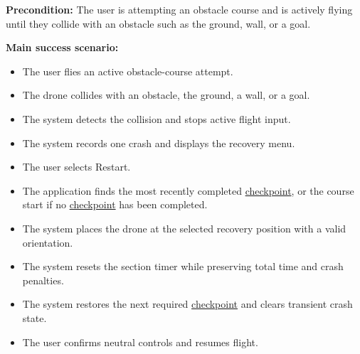 \documentclass[12pt]{article}
\begin{document}
\begin{description}
\textbf{Precondition:} The user is attempting an obstacle course and is
actively flying until they collide with an obstacle such as the ground, wall, or a goal.

\textbf{Main success scenario:}
\begin{itemize}
\item The user flies an active obstacle-course attempt.
\item The drone collides with an obstacle, the ground, a wall, or a goal.
\item The system detects the collision and stops active flight input.
\item The system records one crash and displays the recovery menu.
\item The user selects Restart.
\item The application finds the most recently completed \hyperlink{glos:Checkpoint}{checkpoint}, or the course start if
no \hyperlink{glos:Checkpoint}{checkpoint} has been completed.
\item The system places the drone at the selected recovery position with a valid
orientation.
\item The system resets the section timer while preserving total time and crash
penalties.
\item The system restores the next required \hyperlink{glos:Checkpoint}{checkpoint} and clears transient crash
state.
\item The user confirms neutral controls and resumes flight.
\end{itemize}


\end{description}
\end{document}

